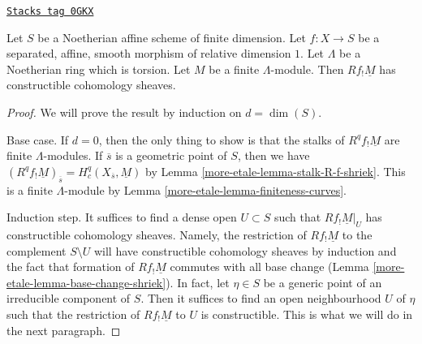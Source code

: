 \begin{lemma}
\label{more-etale-lemma-constant-shriek-rel-dim-1}
\href{https://stacks.math.columbia.edu/tag/0GKX}{\texttt{Stacks tag 0GKX}}

Let $S$ be a Noetherian affine scheme of finite dimension.
Let $f : X \to S$ be a separated, affine, smooth morphism
of relative dimension $1$. Let $\Lambda$ be a Noetherian ring
which is torsion. Let $M$ be a finite $\Lambda$-module.
Then $Rf_!\underline{M}$ has constructible cohomology sheaves.
\end{lemma}

\begin{proof}
We will prove the result by induction on $d = \dim(S)$.

\medskip\noindent
Base case. If $d = 0$, then the only thing to show is that the stalks
of $R^qf_!\underline{M}$ are finite $\Lambda$-modules.
If $\overline{s}$ is a geometric point of $S$, then we have
$(R^qf_!\underline{M})_{\overline{s}} = H^q_c(X_{\overline{s}}, \underline{M})$
by Lemma \ref{more-etale-lemma-stalk-R-f-shriek}.
This is a finite $\Lambda$-module by Lemma \ref{more-etale-lemma-finiteness-curves}.

\medskip\noindent
Induction step. It suffices to find a dense open $U \subset S$ such
that $Rf_!\underline{M}|_U$ has constructible cohomology sheaves.
Namely, the restriction of $Rf_!\underline{M}$ to the complement
$S \setminus U$ will have constructible cohomology sheaves by induction
and the fact that formation of $Rf_!\underline{M}$ commutes
with all base change (Lemma \ref{more-etale-lemma-base-change-shriek}).
In fact, let $\eta \in S$ be a generic point of an irreducible
component of $S$. Then it suffices to find an open neighbourhood $U$
of $\eta$ such that the restriction of $Rf_!\underline{M}$
to $U$ is constructible. This is what we will do in the next paragraph.


\end{proof}
